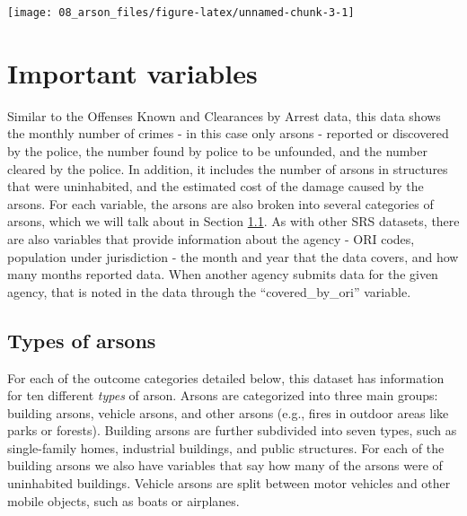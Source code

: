 \documentclass[
]{krantz}
\begin{document}
\begin{center}\texttt{[image: 08\_arson\_files/figure-latex/unnamed-chunk-3-1]} \end{center}

\section{Important variables}\label{important-variables-5}

Similar to the Offenses Known and Clearances by Arrest data,
this data shows the monthly number of crimes - in this case
only arsons - reported or discovered by the police, the
number found by police to be unfounded, and the number
cleared by the police. In addition, it includes the number
of arsons in structures that were uninhabited, and the
estimated cost of the damage caused by the arsons. For each
variable, the arsons are also broken into several categories
of arsons, which we will talk about in Section
\ref{arsonType}. As with other SRS datasets, there are also
variables that provide information about the agency - ORI
codes, population under jurisdiction - the month and year
that the data covers, and how many months reported data.
When another agency submits data for the given agency, that
is noted in the data through the ``covered\_by\_ori''
variable.

\subsection{Types of arsons}\label{arsonType}

For each of the outcome categories detailed below, this
dataset has information for ten different \emph{types} of
arson. Arsons are categorized into three main groups:
building arsons, vehicle arsons, and other arsons (e.g.,
fires in outdoor areas like parks or forests). Building
arsons are further subdivided into seven types, such as
single-family homes, industrial buildings, and public
structures. For each of the building arsons we also have
variables that say how many of the arsons were of
uninhabited buildings. Vehicle arsons are split between
motor vehicles and other mobile objects, such as boats or
airplanes.
\end{document}
